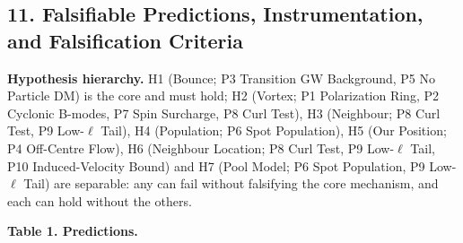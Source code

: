\documentclass[
]{article}
\begin{document}
\hypertarget{falsifiable-predictions-instrumentation-and-falsification-criteria}{%
\subsection{\texorpdfstring{\textbf{11. Falsifiable Predictions,
Instrumentation, and Falsification
Criteria}}{11. Falsifiable Predictions, Instrumentation, and Falsification Criteria}}\label{falsifiable-predictions-instrumentation-and-falsification-criteria}}

\textbf{Hypothesis hierarchy.} H1 (Bounce; P3 Transition GW Background,
P5 No Particle DM) is the core and must hold; H2 (Vortex; P1
Polarization Ring, P2 Cyclonic B-modes, P7 Spin Surcharge, P8 Curl
Test), H3 (Neighbour; P8 Curl Test, P9 Low-\(\ell\) Tail), H4
(Population; P6 Spot Population), H5 (Our Position; P4 Off-Centre Flow),
H6 (Neighbour Location; P8 Curl Test, P9 Low-\(\ell\) Tail, P10
Induced-Velocity Bound) and H7 (Pool Model; P6 Spot Population, P9
Low-\(\ell\) Tail) are separable: any can fail without falsifying the
core mechanism, and each can hold without the others.

\textbf{Table 1. Predictions.}
\end{document}
